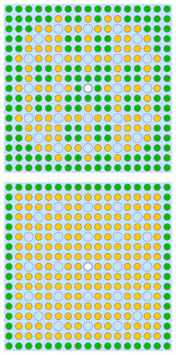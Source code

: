 \begin{appendices}
\begin{figure}[h!]
\centering
\begin{subfigure}{0.48\textwidth}
  \centering
  \includegraphics[width=0.85\linewidth]{figures/unsupervised/geometries/without-features/2-clusters/pinch/assm-16}
  \caption{}
  \label{fig:no-features-assm-16-pinch-2}
\end{subfigure}%
\begin{subfigure}{0.48\textwidth}
  \centering
  \includegraphics[width=0.85\linewidth]{figures/unsupervised/geometries/without-features/2-clusters/combined/assm-16}

\end{subfigure}
\end{figure}
\end{appendices}
